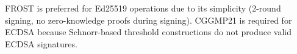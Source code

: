 FROST is preferred for Ed25519 operations due to its simplicity (2-round
signing, no zero-knowledge proofs during signing). CGGMP21 is required for
ECDSA because Schnorr-based threshold constructions do not produce valid ECDSA
signatures.

